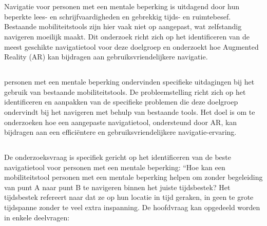 \chapter{}%
\label{ch:inleiding}
Navigatie voor personen met een mentale beperking is uitdagend door hun beperkte lees- en schrijfvaardigheden en gebrekkig tijds- en ruimtebesef. Bestaande mobiliteitstools zijn hier vaak niet op aangepast, wat zelfstandig navigeren moeilijk maakt. Dit onderzoek richt zich op het identificeren van de meest geschikte navigatietool voor deze doelgroep en onderzoekt hoe Augmented Reality (AR) kan bijdragen aan gebruiksvriendelijkere navigatie.

\section{}%
\label{sec:probleemstelling}

personen met een mentale beperking ondervinden specifieke uitdagingen bij het gebruik van bestaande mobiliteitstools. De probleemstelling richt zich op het identificeren en aanpakken van de specifieke problemen die deze doelgroep ondervindt bij het navigeren met behulp van bestaande tools. Het doel is om te onderzoeken hoe een aangepaste navigatietool, ondersteund door AR, kan bijdragen aan een efficiëntere en gebruiksvriendelijkere navigatie-ervaring.

\section{}%
\label{sec:onderzoeksvraag}

De onderzoeksvraag is specifiek gericht op het identificeren van de beste navigatietool voor personen met een mentale beperking: ``Hoe kan een mobiliteitstool personen met een mentale beperking helpen om zonder begeleiding van punt A naar punt B te navigeren binnen het juiste tijdsbestek? Het tijdsbestek refereert naar dat ze op hun locatie in tijd geraken, in geen te grote tijdspanne zonder te veel extra inspanning. De hoofdvraag kan opgedeeld worden in enkele deelvragen:

